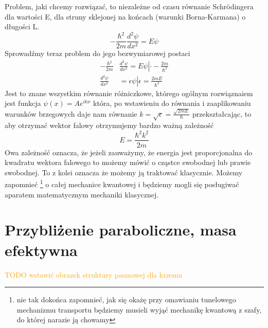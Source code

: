         \noindent Problem, jaki chcemy rozwiązać, to niezależne od czasu równanie Schr\"odingera dla wartości E, dla struny sklejonej na końcach (warunki Borna-Karmana) o długości L.
        \begin{equation}
            -\frac{\hbar^2}{2m}\frac{d^2 \psi}{d x^2} = E \psi  \nonumber
        \end{equation}
        Sprowadźmy teraz problem do jego bezwymiarowej postaci 
        \begin{align*}
            -\frac{\hbar^2}{2m}&\frac{d^2 \psi}{d x^2} = E \psi \left| \cdot -\frac{2m}{\hbar^2} \right. \nonumber \\
            \frac{d^2 \psi}{d x^2} &= \epsilon \psi \left|\epsilon  = \frac{2mE}{\hbar^2}  \right. \nonumber
        \end{align*}
        Jest to znane wszystkim równanie różniczkowe, którego ogólnym rozwiąznaiem jest funkcja $\psi(x) = Ae^{ikx}$ która, po wstawieniu do równania i zaaplikowaniu warunków brzegowych daje nam równanie 
        $k = \sqrt{\epsilon} = \frac{\sqrt{2mE}}{\hbar}$ przekształcając, to aby otrzymać wektor falowy otrzymujemy bardzo ważną zależność
        \begin{equation}
            E = \frac{\hbar^2 k^2}{2m} \label{eq: free particle}
        \end{equation}
        Owa zależność oznacza, że jeżeli zauważymy, że energia jest proporcjonalna do kwadratu wektora falowego to możemy mówić o cząstce swobodnej lub prawie swobodnej. To z kolei oznacza że możemy ją traktować klasycznie. 
        Możemy zapomnieć \footnote{nie tak dokońca zapomnieć, jak się okażę przy omawianiu tunelowego mechanizmu transportu będziemy musieli wyjąć mechanikę kwantową z szafy, do której narazie ją chowamy} o całej mechanice kwantowej 
        i będziemy mogli się posługiwać aparatem matematycznym mechaniki klasycznej.    

\section{Przybliżenie paraboliczne, masa efektywna}\label{sec: effective mass and parabolic approx}
    \noindent \textcolor{orange}{ TODO wstawić obrazek struktury pasmowej dla krzemu} \newline \newline

